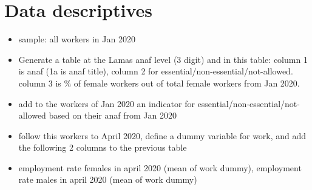 \documentclass{article}
\begin{document}
\section{Data descriptives}
\begin{itemize}
    \item sample: all workers in Jan 2020
    \item Generate a table at the Lamas anaf level (3 digit) and in this table: column 1 is anaf (1a is anaf title), column 2 for essential/non-essential/not-allowed. column 3 is \% of female workers out of total female workers from Jan 2020.
    \item add to the workers of Jan 2020 an indicator for essential/non-essential/not-allowed based on their anaf from Jan 2020
    \item follow this workers to April 2020, define a dummy variable for work, and add the following 2 columns to the previous table
    \item employment rate females in april 2020 (mean of work dummy), employment rate males in april 2020 (mean of work dummy)
\end{itemize}
\end{document}
